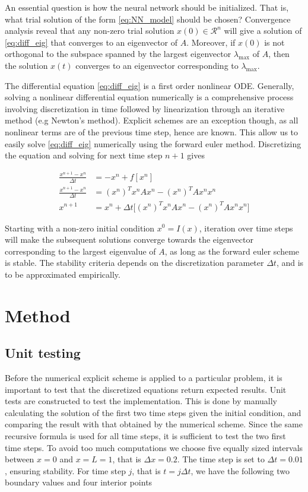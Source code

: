\documentclass[12pt]{extarticle}
\begin{document}
An essential question is how the neural network should be initialized. That is, what trial solution of the form \eqref{eq:NN_model} should be chosen? Convergence analysis reveal that any non-zero trial solution $x(0) \in \mathcal{R}^n$ will give a solution of \eqref{eq:diff_eig} that converges to an eigenvector of $A$. Moreover, if $x(0)$ is not orthogonal to the subspace spanned by the largest eigenvector $\lambda_{\mathrm{max}}$ of $A$, then the solution $x(t)$ converges to an eigenvector corresponding to $\lambda_{\mathrm{max}}$.

The differential equation \eqref{eq:diff_eig} is a first order nonlinear ODE. Generally, solving a nonlinear differential equation numerically is a comprehensive process involving discretization in time followed by linearization through an iterative method (e.g Newton's method). Explicit schemes are an exception though, as all nonlinear terms are of the previous time step, hence are known. This allow us to easily solve \eqref{eq:diff_eig} numerically using the forward euler method. Discretizing the equation and solving for next time step $n+1$ gives

\begin{align*}
	\frac{x^{n+1}-x^n}{\Delta t} &= -x^n + f[x^n] \\
	\frac{x^{n+1}-x^n}{\Delta t} &= (x^n)^T x^n A x^n - (x^n)^T A x^n x^n \\
	x^{n+1} &= x^n + \Delta t\big[ (x^n)^T x^n A x^n - (x^n)^T A x^n x^n \big]
\end{align*}

Starting with a non-zero initial condition $x^0 = I(x)$, iteration over time steps will make the subsequent solutions converge towards the eigenvector corresponding to the largest eigenvalue of $A$, as long as the forward euler scheme is stable. The stability criteria depends on the discretization parameter $\Delta t$, and is to be approximated empirically. 



\section{Method}
\subsection*{Unit testing}

Before the numerical explicit scheme is applied to a particular problem, it is important to test that the discretized equations return expected results. Unit tests are constructed to test the implementation. This is done by manually calculating the solution of the first two time steps given the initial condition, and comparing the result with that obtained by the numerical scheme. Since the same recursive formula is used for all time steps, it is sufficient to test the two first time steps. To avoid too much computations we choose five equally sized intervals between $x=0$ and $x=L=1$, that is $\Delta x = 0.2$. The time step is set to $\Delta t = 0.01$, ensuring stability.
For time step $j$, that is $t=j\Delta t$, we have the following two boundary values and four interior points
\end{document}
